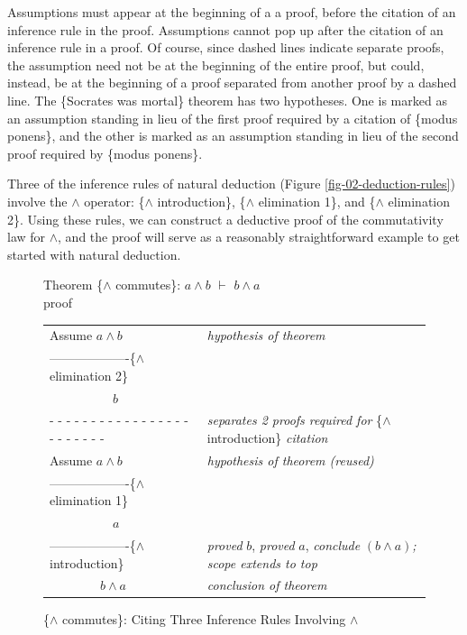 Assumptions must appear at the beginning of a
a proof, before the citation of an
inference rule in the proof.
Assumptions cannot pop up after the citation
of an inference rule in a proof.
Of course, since dashed lines indicate separate proofs,
the assumption need not be at the beginning of the entire
proof, but could, instead, be at the beginning of
a proof separated from another proof by a dashed line.
The \{Socrates was mortal\} theorem has two hypotheses.
One is marked as an assumption standing in lieu of the first proof
required by a citation of \{modus ponens\},
and the other is marked as an assumption
standing in lieu of the second proof
required by \{modus ponens\}.

Three of the inference rules of natural deduction
(Figure \ref{fig-02-deduction-rules})
involve the $\wedge$ operator:
\{$\wedge$ introduction\},
\{$\wedge$ elimination 1\}, and
\{$\wedge$ elimination 2\}.
Using these rules, we can construct a deductive proof
of the commutativity law for $\wedge$,
and the proof will serve as a reasonably straightforward
example to get started with natural deduction.

\begin{figure}
Theorem \{$\wedge$ commutes\}: $a \wedge b$ $\vdash$ $b \wedge a$ \\
proof
\begin{center}
\begin{tabular}{ll}
Assume $a \wedge b$                             &\emph{hypothesis of theorem}\\
-------------------\{$\wedge$ elimination 2\}   &\\
~~~~~~~~~~$b$                                   &\\
 - - - - - - - - - - - - - - - - - - - - - - - -&\emph{separates 2 proofs required for }\{$\wedge$ introduction\} \emph{citation}\\
Assume $a \wedge b$                             &\emph{hypothesis of theorem (reused)}\\
-------------------\{$\wedge$ elimination 1\}   &\\
~~~~~~~~~~$a$                                   &\\
-------------------\{$\wedge$ introduction\}    &\emph{proved} $b$, \emph{proved} $a$, \emph{conclude} $(b \wedge a)$\emph{; scope extends to top}\\
~~~~~~~~$b \wedge a$                            &\emph{conclusion of theorem}\\
\end{tabular}
\end{center}
\caption{\{$\wedge$ commutes\}: Citing Three Inference Rules Involving $\wedge$}
\label{fig:and-commutes-proof}
\end{figure}

